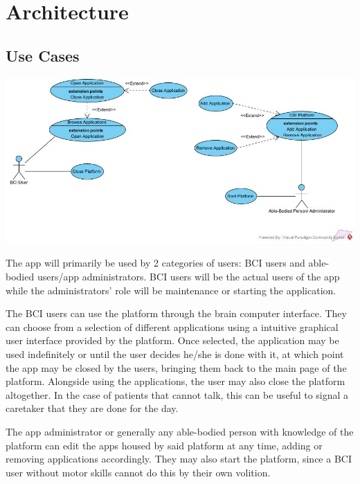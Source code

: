 
\chapter{Architecture}\label{chapter:Architecture}

\section{Use Cases}\label{sect:use cases}
\vspace{20pt}
\includegraphics[width = 420pt]{Diagrams/Use Case.jpg}

\hspace{\parindent} The app will primarily be used by 2 categories of users: BCI users and able-bodied users/app administrators. BCI users will be the actual users of the app while the administrators' role will be maintenance or starting the application. 

\hspace{\parindent} The BCI users can use the platform through the brain computer interface. They can choose from a selection of different applications using a intuitive graphical user interface provided by the platform. Once selected, the application may be used indefinitely or until the user decides he/she is done with it, at which point the app may be closed by the users, bringing them back to the main page of the platform. Alongside using the applications, the user may also close the platform altogether. In the case of patients that cannot talk, this can be useful to signal a caretaker that they are done for the day.

\hspace{\parindent} The app administrator or generally any able-bodied person with knowledge of the platform can edit the apps housed by said platform at any time, adding or removing applications accordingly. They may also start the platform, since a BCI user without motor skills cannot do this by their own volition.


